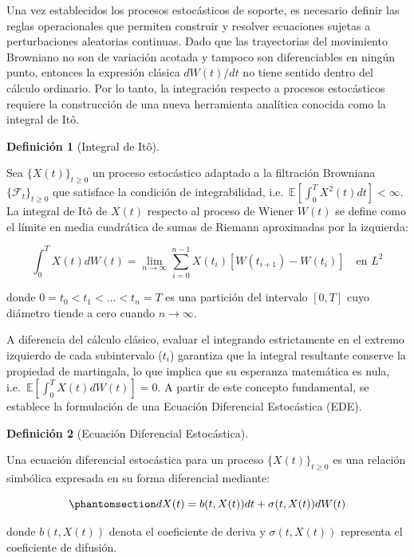 \documentclass[
  spanish,
  letterpaper,
  DIV=11,
  numbers=noendperiod]{scrreprt}
\theoremstyle{plain}
\theoremstyle{definition}
\newtheorem{definition}{Definición}[chapter]
\theoremstyle{remark}
\begin{document}
Una vez establecidos los procesos estocásticos de soporte, es necesario
definir las reglas operacionales que permiten construir y resolver
ecuaciones sujetas a perturbaciones aleatorias continuas. Dado que las
trayectorias del movimiento Browniano no son de variación acotada y
tampoco son diferenciables en ningún punto, entonces la expresión
clásica \(dW(t)/dt\) no tiene sentido dentro del cálculo ordinario. Por
lo tanto, la integración respecto a procesos estocásticos requiere la
construcción de una nueva herramienta analítica conocida como la
integral de Itô.

\begin{definition}[Integral de
Itô]\protect\hypertarget{def-integral-ito}{}\label{def-integral-ito}

Sea \(\{X(t)\}_{t \ge 0}\) un proceso estocástico adaptado a la
filtración Browniana \(\{\mathcal{F}_t\}_{t \ge 0}\) que satisface la
condición de integrabilidad,
i.e.~\(\mathbb{E}\left[\int_0^T X^2(t) dt\right] < \infty\). La integral
de Itô de \(X(t)\) respecto al proceso de Wiener \(W(t)\) se define como
el límite en media cuadrática de sumas de Riemann aproximadas por la
izquierda:

\[
\int_0^T X(t) dW(t) = \lim_{n \to \infty} \sum_{i=0}^{n-1} X(t_i) [W(t_{i+1}) - W(t_i)] \quad \text{en } L^2
\]

donde \(0 = t_0 < t_1 < \dots < t_n = T\) es una partición del intervalo
\([0, T]\) cuyo diámetro tiende a cero cuando \(n \to \infty\).

\end{definition}

A diferencia del cálculo clásico, evaluar el integrando estrictamente en
el extremo izquierdo de cada subintervalo (\(t_i\)) garantiza que la
integral resultante conserve la propiedad de martingala, lo que implica
que su esperanza matemática es nula,
i.e.~\(\mathbb{E}\left[\int_0^T X(t) dW(t)\right] = 0\). A partir de
este concepto fundamental, se establece la formulación de una Ecuación
Diferencial Estocástica (EDE).

\begin{definition}[Ecuación Diferencial
Estocástica]\protect\hypertarget{def-ede-general}{}\label{def-ede-general}

Una ecuación diferencial estocástica para un proceso
\(\{X(t)\}_{t \ge 0}\) es una relación simbólica expresada en su forma
diferencial mediante:

\begin{equation}\phantomsection\label{eq-ede-general-diff}{
dX(t) = b(t, X(t)) dt + \sigma(t, X(t)) dW(t)
}\end{equation}

donde \(b(t, X(t))\) denota el coeficiente de deriva y
\(\sigma(t, X(t))\) representa el coeficiente de difusión.

\end{definition}
\end{document}
